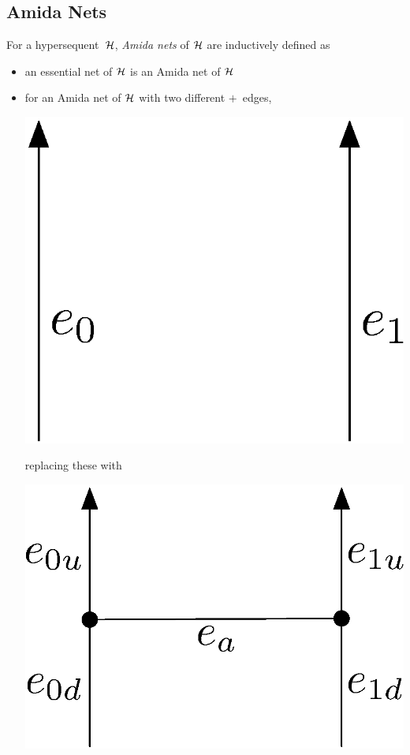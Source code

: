 \subsection{Amida Nets}

 \begin{definition}
For a hypersequent~$\mathcal{H}$,
\textit{Amida nets} of $\mathcal{H}$ are inductively
  defined as
\begin{itemize}
 \item an essential net of $\mathcal{H}$ is an Amida net of $\mathcal{H}$
 \item for an Amida net of $\mathcal{H}$ with two different $+$~edges,
	\begin{center}
	 \includegraphics[scale=0.4]{twoedges.eps}
	\end{center}
       replacing these with
	\begin{center}
	 \includegraphics[scale=0.4]{twoedges_amida.eps}

\end{center}
\end{itemize}
\end{definition}
